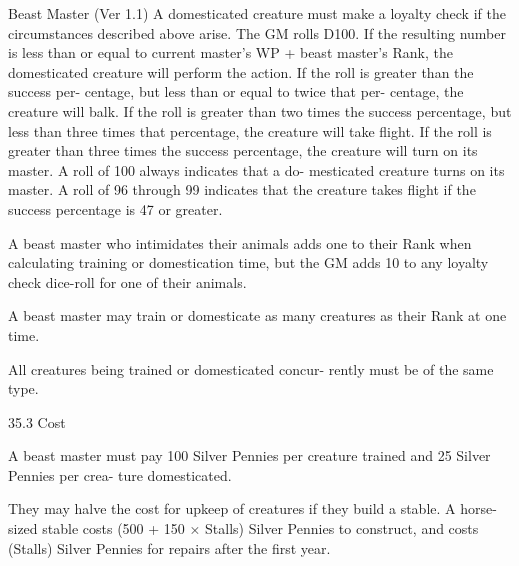 \begin{Chapter}{Beast Master (Ver 1.1)}
A domesticated creature must make a loyalty check 
if  the  circumstances  described  above  arise.  The 
GM rolls D100. If the resulting number is less than 
or  equal  to  current  master’s  WP  +  beast  master’s 
Rank,  the  domesticated  creature  will  perform  the 
action.  If  the  roll  is  greater  than  the  success  per-
centage,  but  less  than  or  equal  to  twice  that  per-
centage, the creature will balk. If the roll is greater 
than  two  times  the  success  percentage,  but  less 
than  three  times  that  percentage,  the  creature  will 
take flight. If the roll is greater than three times the 
success  percentage,  the  creature  will  turn  on  its 
master.  A  roll  of  100  always  indicates  that  a  do-
mesticated creature turns on its master. A roll of 96 
through 99 indicates that the creature takes flight if 
the success percentage is 47 or greater. 

A beast master who intimidates their animals adds 
one  to  their  Rank  when  calculating  training  or 
domestication  time,  but  the  GM  adds  10  to  any 
loyalty check dice-roll for one of their animals. 

A  beast  master  may  train  or  domesticate  as 
many creatures as their Rank at one time. 

All creatures being trained or domesticated concur-
rently must be of the same type. 

35.3 Cost 

A beast master must pay 100 Silver Pennies per 
creature trained and 25 Silver Pennies per crea-
ture domesticated. 

They may halve the cost for upkeep of creatures if 
they build a stable. A horse-sized stable costs (500 
+  150  ×  Stalls)  Silver  Pennies  to  construct,  and 
costs  (Stalls)  Silver  Pennies  for  repairs  after  the 
first year. 
\end{Chapter}
